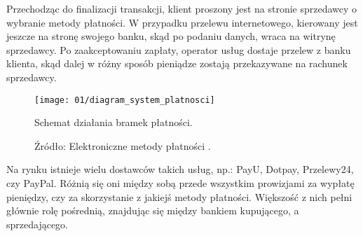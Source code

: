 Przechodząc do finalizacji transakcji, klient proszony jest na stronie 
sprzedawcy o wybranie metody płatności. W przypadku przelewu internetowego, 
kierowany jest jeszcze na stronę swojego banku, skąd po podaniu danych, wraca 
na witrynę sprzedawcy. Po zaakceptowaniu zapłaty, operator usług dostaje 
przelew z banku klienta, skąd dalej w różny sposób pieniądze zostają 
przekazywane na rachunek sprzedawcy.

\begin{figure}[h]
	\begin{center}
		\texttt{[image: 01/diagram\_system\_platnosci]}
	\end{center}
	\caption{Schemat działania bramek płatności.}
	\vspace{-0.4cm}
	\caption*{Źródło: Elektroniczne metody płatności \cite{elektroniczne_metody_platnosci}.}
\end{figure}

Na rynku istnieje wielu dostawców takich usług, np.: PayU, Dotpay, Przelewy24, 
czy PayPal. Różnią się oni między sobą przede wszystkim prowizjami za wypłatę 
pieniędzy, czy za skorzystanie z jakiejś metody płatności. Większość z nich 
pełni głównie rolę pośrednią, znajdując się między bankiem kupującego, a 
sprzedającego. 
